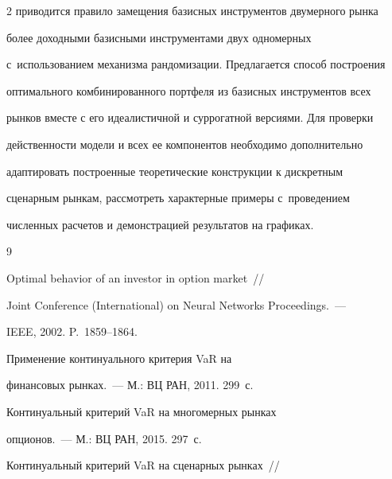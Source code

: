 \begin{multicols}{2}
приводится правило замещения базисных инструментов двумерного рынка 


более доходными базисными инструментами двух одномерных 


с~использованием механизма рандомизации. Предлагается способ построения 


оптимального комбинированного портфеля из базисных инструментов всех 


рынков вместе с его идеалистичной и суррогатной версиями. Для проверки 


действенности модели и всех ее компонентов необходимо дополнительно 


адаптировать построенные теоретические конструкции к дискретным 


сценарным рынкам, рассмотреть характерные примеры с~проведением 


численных расчетов и демонстрацией результатов на графиках. 





\vspace*{-6pt}


  


{\small\frenchspacing


 {%




 \begin{thebibliography}{9}




   Optimal behavior of an investor in option market~//  


Joint Conference (International) on Neural Networks Proceedings.~--- 


 IEEE, 2002. P.~1859--1864. 




   Применение континуального критерия VaR на 


финансовых рынках.~--- М.: ВЦ РАН, 2011. 299~с. 




   Континуальный критерий VaR на многомерных рынках 


опционов.~--- М.: ВЦ РАН, 2015. 297~с. 




   Континуальный критерий VaR на сценарных рынках~// 



\end{thebibliography}}}
\end{multicols}
